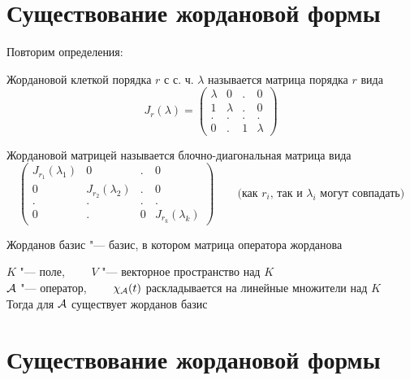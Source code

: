 \section{Существование жордановой формы}

Повторим определения:

\begin{definition}
	Жордановой клеткой порядка $ r $ с с. ч. $ \lambda $ называется матрица порядка $ r $ вида
	$$ J_r(\lambda) =
	\begin{pmatrix}
		\lambda & 0 & . & 0 \\
		1 & \lambda & . & 0 \\
		. & . & . & . \\
		0 & . & 1 & \lambda
	\end{pmatrix} $$
\end{definition}

\begin{definition}
	Жордановой матрицей называется блочно-диагональная матрица вида
	$$
	\begin{pmatrix}
		J_{r_1}(\lambda_1) & 0 & . & 0 \\
		0 & J_{r_2}(\lambda_2) & . & 0 \\
		. & . & . & . \\
		0 & . & 0 & J_{r_k}(\lambda_k)
	\end{pmatrix} \qquad \text{(как } r_i \text{, так и } \lambda_i \text{ могут совпадать)} $$
\end{definition}

\begin{definition}
	Жорданов базис "--- базис, в котором матрица оператора жорданова
\end{definition}

\begin{theorem}
	$ K $ "--- поле, $ \qquad V $ "--- векторное пространство над $ K $ \\
	$ \mathcal{A} $ "--- оператор, $ \qquad \chi_{\mathcal{A}}(t) $ раскладывается на линейные множители над $ K $ \\
	Тогда для $ \mathcal{A} $ существует жорданов базис
\end{theorem}


\section{Существование жордановой формы}

